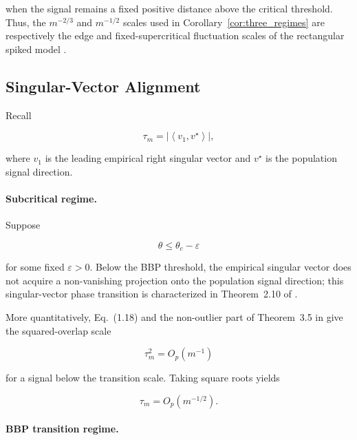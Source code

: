 when the signal remains a fixed positive distance above the critical
threshold. Thus, the $m^{-2/3}$ and $m^{-1/2}$ scales used in
Corollary~\ref{cor:three_regimes} are respectively the edge and
fixed-supercritical fluctuation scales of the rectangular spiked model
\cite{benaych2012singular,ding2020high}.


\subsection{Singular-Vector Alignment}

Recall

\begin{equation}
\tau_m
=
\left|
\left\langle v_1,v^\star\right\rangle
\right|,
\end{equation}

where $v_1$ is the leading empirical right singular vector and $v^\star$
is the population signal direction.


\paragraph{Subcritical regime.}

Suppose

\begin{equation}
\theta
\leq
\theta_c-\varepsilon
\end{equation}

for some fixed $\varepsilon>0$.
Below the BBP threshold, the empirical singular vector does not acquire a
non-vanishing projection onto the population signal direction; this
singular-vector phase transition is characterized in
Theorem~2.10 of \cite{benaych2012singular}.

More quantitatively, Eq.~(1.18) and the non-outlier part of
Theorem~3.5 in \cite{ding2020high} give the squared-overlap scale

\begin{equation}
\tau_m^2
=
O_p(m^{-1})
\end{equation}

for a signal below the transition scale. Taking square roots yields

\begin{equation}
\tau_m
=
O_p(m^{-1/2}).
\label{eq:tau_sub_app}
\end{equation}


\paragraph{BBP transition regime.}

